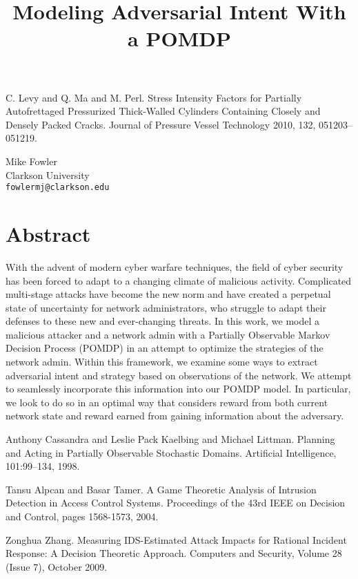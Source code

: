 \documentclass[article,A4,11pt]{llncs}%
\begin{document}

\begin{thebibliography}{10}
{\sc C. Levy and Q. Ma and M. Perl}. {Stress Intensity Factors for Partially Autofrettaged Pressurized Thick-Walled Cylinders Containing Closely and Densely Packed Cracks}. Journal of Pressure Vessel Technology 2010, 132, 051203–051219.
\end{thebibliography}

\title{Modeling Adversarial Intent With a POMDP}
 \author{} \institute{}
\maketitle
\begin{center}
{\large Mike  Fowler}\\
Clarkson University\\
{\tt fowlermj@clarkson.edu}
\end{center}

\section*{Abstract}
With the advent of modern cyber warfare techniques, the field of cyber security has been forced to adapt to a changing climate of malicious activity. Complicated multi-stage attacks have become the new norm and have created a perpetual state of uncertainty for network administrators, who struggle to adapt their defenses to these new and ever-changing threats. In this work, we model a malicious attacker and a network admin with a Partially Observable Markov Decision Process (POMDP) in an attempt to optimize the strategies of the network admin.  Within this framework, we examine some ways to extract adversarial intent and strategy based on observations of the network.  We attempt to seamlessly incorporate this information into our POMDP model. In particular, we look to do so in an optimal way that considers reward from both current network state and reward earned from gaining information about the adversary.


\begin{thebibliography}{10}
{\sc Anthony Cassandra and Leslie Pack Kaelbing and Michael Littman}. {Planning and Acting in Partially Observable Stochastic Domains}. Artificial Intelligence, 101:99--134, 1998.

{\sc Tansu Alpcan and Basar Tamer}. {A Game Theoretic Analysis of Intrusion Detection in Access Control Systems}. Proceedings of the 43rd IEEE on Decision and Control, pages 1568-1573, 2004.

{\sc Zonghua Zhang}. {Measuring IDS-Estimated Attack Impacts for Rational Incident Response: A Decision Theoretic Approach}. Computers and Security, Volume 28 (Issue 7), October 2009.
\end{thebibliography}
\end{document}

